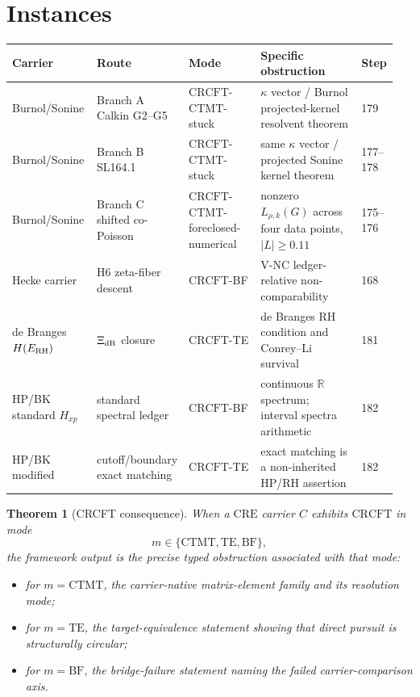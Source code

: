 \documentclass[11pt]{article}
\newtheorem{theorem}{Theorem}
\newcommand{\CRCFT}{\mathrm{CRCFT}}
\newcommand{\CTMT}{\mathrm{CTMT}}
\newcommand{\CRE}{\mathrm{CRE}}
\begin{document}
\section*{Instances}

\begin{center}
\begin{tabular}{p{0.22\linewidth}p{0.20\linewidth}p{0.19\linewidth}p{0.27\linewidth}p{0.07\linewidth}}
\toprule
Carrier & Route & Mode & Specific obstruction & Step\\
\midrule
Burnol/Sonine & Branch A Calkin G2--G5
& \(\CRCFT\)-\(\CTMT\)-stuck
& \(\kappa\) vector / Burnol projected-kernel resolvent theorem
& 179\\
Burnol/Sonine & Branch B SL164.1
& \(\CRCFT\)-\(\CTMT\)-stuck
& same \(\kappa\) vector / projected Sonine kernel theorem
& 177--178\\
Burnol/Sonine & Branch C shifted co-Poisson
& \(\CRCFT\)-\(\CTMT\)-foreclosed-numerical
& nonzero \(L_{\rho,k}(G)\) across four data points, \(|L|\ge 0.11\)
& 175--176\\
Hecke carrier & H6 zeta-fiber descent
& \(\CRCFT\)-BF
& V-NC ledger-relative non-comparability
& 168\\
de Branges \(H(E_{\rm RH})\)
& \(\Xi_{\rm dB}\) closure
& \(\CRCFT\)-TE
& de Branges RH condition and Conrey--Li survival
& 181\\
HP/BK standard \(H_{xp}\)
& standard spectral ledger
& \(\CRCFT\)-BF
& continuous \(\mathbb R\) spectrum; interval spectra arithmetic
& 182\\
HP/BK modified
& cutoff/boundary exact matching
& \(\CRCFT\)-TE
& exact matching is a non-inherited HP/RH assertion
& 182\\
\bottomrule
\end{tabular}
\end{center}

\begin{theorem}[CRCFT consequence]
When a \(\CRE\) carrier \(C\) exhibits \(\CRCFT\) in mode
\[
m\in\{\CTMT,\mathrm{TE},\mathrm{BF}\},
\]
the framework output is the precise typed obstruction associated with that
mode:
\begin{itemize}
\item for \(m=\CTMT\), the carrier-native matrix-element family and its
resolution mode;
\item for \(m=\mathrm{TE}\), the target-equivalence statement showing that
direct pursuit is structurally circular;
\item for \(m=\mathrm{BF}\), the bridge-failure statement naming the failed
carrier-comparison axis.
\end{itemize}
\end{theorem}
\end{document}
